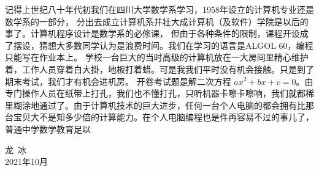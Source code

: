 \documentclass[main.tex]{subfiles}
\begin{document}
记得上世纪八十年代初我们在四川大学数学系学习，1958年设立的计算机专业还是数学系的一部分，
分出去成立计算机系并壮大成计算机（及软件）学院是以后的事了。计算机程序设计是数学系的必修课，
但由于各种条件的限制，课程开设成了摆设，猜想大多数同学认为是浪费时间。我们在学习的语言是ALGOL 60，编程只能写在作业本上。
学校一台巨大的当时高级的计算机放在一大房间里精心维护着，工作人员穿着白大掛，地板打着蜡。可是我我们平时没有机会接触。只是到了期末考试，我们才有机会进机房。
开卷考试题是解二次方程 $ax^2+bx+c = 0$。由专门操作人员在纸带上打孔，我们也不懂打孔，只听机器卡嚓卡嚓响，我们就都稀里糊涂地通过了。由于计算机技术的巨大进步，任何一台个人电脑的都会拥有比那台宝贝大不是知多少倍的计算能力。在个人电脑编程也是件再容易不过的事儿了，普通中学数学教育足以

\begin{flushright}
龙\, 冰\,\,\\
2021年10月
\end{flushright}
\end{document}

